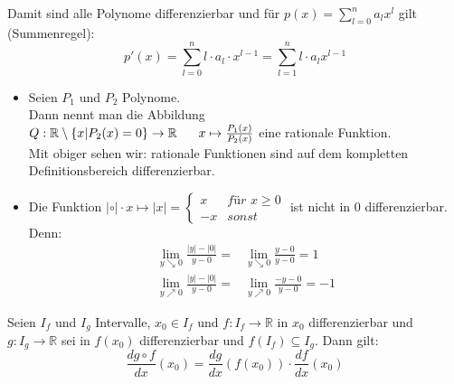 Damit sind alle Polynome differenzierbar und für 
$p(x) = \sum_{l=0}^{n} a_l x^l$ gilt (Summenregel):
\begin{equation*}p'(x) = \sum_{l = 0}^n l \cdot a_l \cdot x^{l-1} 
= \sum_{l=1}^n l \cdot a_l x^{l-1}
\end{equation*}

\begin{itemize}
	\item Seien $P_1$ und $P_2$ Polynome. \\
	Dann nennt man die Abbildung \\
	\noindent\hspace*{5mm}$Q : \mathbb{R}\setminus\{x|P_2(x) = 0\}
	\rightarrow \mathbb{R} \\
	\noindent\hspace*{6mm}x \mapsto \frac{P_1(x)}{P_2(x)}$ 
	eine rationale Funktion. \\
	Mit obiger sehen wir: rationale Funktionen sind auf dem kompletten
	 Definitionsbereich differenzierbar.
	 
	\item Die Funktion $|\circ | \cdot x \mapsto |x| = \begin{cases}x  & \textit{für } x\geq 0 \\ - x & sonst \end{cases}$
	ist nicht in 0 differenzierbar. Denn:
	\begin{align*}
		\lim\limits_{y \searrow 0}{\frac{|y|-|0|}{y-0}}
		= & \lim\limits_{y \searrow 0}{\frac{y-0}{y-0}} = 1 \\
		\lim\limits_{y \nearrow 0}{\frac{|y| -|0|}{y-0}} =  & \lim\limits_{y 
	\nearrow 0}{\frac{-y-0}{y-0}} = -1
	\end{align*}
\end{itemize}

\begin{Satz}[Kettenregel]{
	Seien $I_f$ und $I_g$ Intervalle, $x_0 \in I_f$ und 
	$f : I_f \rightarrow \mathbb{R}$ in $x_0$ differenzierbar und 
	$g: I_g \rightarrow \mathbb{R}$ sei in $f(x_0)$ differenzierbar und 
	$f(I_f) \subseteq I_g$. Dann gilt:
	\begin{equation*}
	\frac{d g \circ f}{dx}(x_0) = \frac{dg}{dx}(f(x_0)) \cdot \frac{df}{dx}(x_0)
	\end{equation*}
}\end{Satz}

